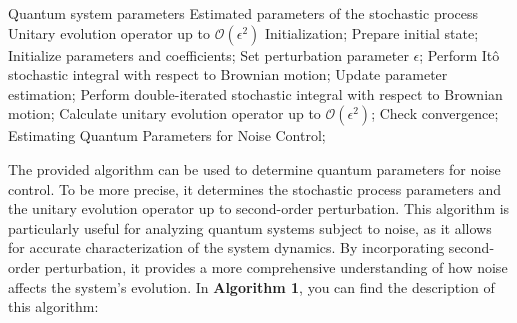 \documentclass[journal,twocolumn]{IEEEtran}
\begin{document}
\begin{algorithm}[H]
\caption{Method for Estimating Quantum Parameters for Noise Control}
\begin{algorithmic}[1]
\Require Quantum system parameters
\Ensure Estimated parameters of the stochastic process Unitary evolution operator up to $\mathcal{O}(\epsilon^2)$
\State Initialization;
    \State Prepare initial state;
    \State Initialize parameters and coefficients;
    \State Set perturbation parameter $\epsilon$;
        \State Perform Itô stochastic integral with respect to Brownian motion;
    \EndIf
    \State Update parameter estimation;
        \State Perform double-iterated stochastic integral with respect to Brownian motion;
    \EndIf
    \State Calculate unitary evolution operator up to $\mathcal{O}(\epsilon^2)$;
    \State Check convergence;
\EndWhile
\State \Return Estimating Quantum Parameters for Noise Control;
\end{algorithmic}
\end{algorithm}

 The provided algorithm can be used to determine quantum parameters for noise control. To be more precise, it determines the stochastic process parameters and the unitary evolution operator up to second-order perturbation. This algorithm is particularly useful for analyzing quantum systems subject to noise, as it allows for accurate characterization of the system dynamics. By incorporating second-order perturbation, it provides a more comprehensive understanding of how noise affects the system's evolution. In \textbf{Algorithm 1}, you can find the description of this algorithm:
 
\end{document}

